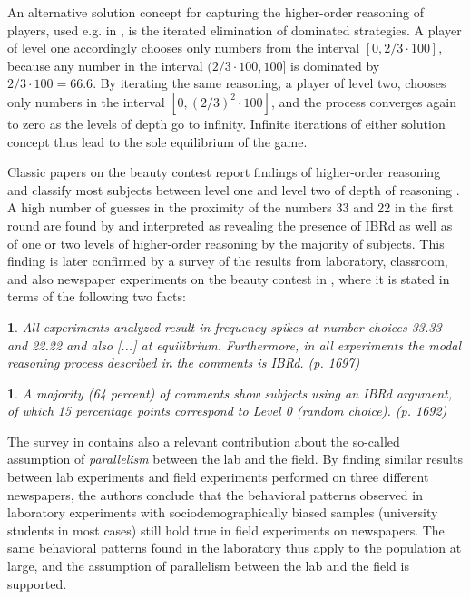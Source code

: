 \documentclass[12pt,review]{elsarticle}
\newtheorem{fact}[thm]{\protect\factname}
\providecommand{\factname}{Fact}
\begin{document}
An alternative solution concept for capturing the higher-order reasoning
of players, used e.g. in \citet{HoCamererWeigelt98}, is the iterated
elimination of dominated strategies. A player of level one accordingly
chooses only numbers from the interval $[0,2/3\cdot100]$, because
any number in the interval $(2/3\cdot100,100]$ is dominated by $2/3\cdot100=66.6$.
By iterating the same reasoning, a player of level two, chooses only
numbers in the interval $[0,(2/3)^{2}\cdot100]$, and the process
converges again to zero as the levels of depth go to infinity. Infinite
iterations of either solution concept thus lead to the sole equilibrium
of the game.

Classic papers on the beauty contest report findings of higher-order
reasoning and classify most subjects between level one and level two
of depth of reasoning \citep{Nagel95, HoCamererWeigelt98, DuffyNagel97, Rapoport06, selten1998zahlenwahlspiel, NagelEtAl02}. A high number of guesses in the proximity of the numbers 33 and 22
in the first round are found by \citet{Nagel95, selten1998zahlenwahlspiel} and interpreted as
revealing the presence of IBRd as well as of one or two levels of higher-order reasoning by the majority of subjects. This finding is later confirmed by a survey of the results from laboratory, classroom,
and also newspaper experiments on the beauty contest in \citet{NagelEtAl02},
where it is stated in terms of the following two facts:

\begin{fact}
\label{fact:spikes}All experiments analyzed result in frequency spikes
at number choices 33.33 and 22.22 and also {[}...{]} at equilibrium.
Furthermore, in all experiments the modal reasoning process described
in the comments is IBRd. (p. 1697)
\end{fact}

\begin{fact}
\label{fact:IBRd}A majority (64 percent) of comments show subjects
using an IBRd argument, of which 15 percentage points correspond to
Level 0 (random choice). (p. 1692) 
\end{fact}

The survey in \citet{NagelEtAl02} contains also a relevant contribution
about the so-called assumption of \emph{parallelism} between the lab
and the field. By finding similar results between lab experiments
and field experiments performed on three different newspapers, the
authors conclude that the behavioral patterns observed in laboratory
experiments with sociodemographically biased samples (university students
in most cases) still hold true in field experiments on newspapers.
The same behavioral patterns found in the laboratory thus apply to
the population at large, and the assumption of parallelism between
the lab and the field is supported.
\end{document}
